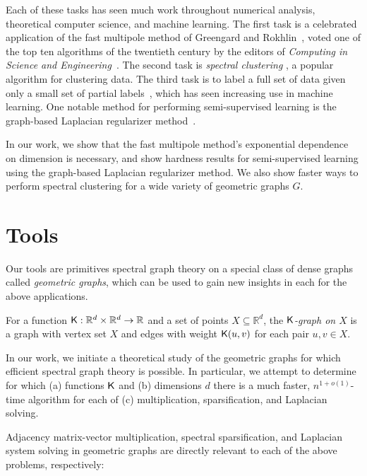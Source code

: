 \vspace{1mm}

Each of these tasks has seen much work throughout numerical analysis,
     theoretical computer science, and machine learning. The first task
     is a celebrated application of the fast multipole method of
     Greengard and Rokhlin~\cite{gr87, gr88, gr89}, voted one of the top
     ten algorithms of the twentieth century by the editors of
     \emph{Computing in Science and
       Engineering}~\cite{dongarra2000guest}.  The second task is
       \emph{spectral clustering} \cite{njw02, lwdh13}, a popular
       algorithm for clustering data. The third task is to label a full
       set of data given only a small set of partial
       labels~\cite{z05survey, csbz09, zl05}, which has seen increasing
       use in machine learning. One notable method for performing
       semi-supervised learning is the graph-based Laplacian regularizer
       method~\cite{lszlh19,zl05, bns06,z05}.

In our work, we show that the fast multipole method's exponential
dependence on dimension is necessary, and show hardness results for
semi-supervised learning using the graph-based Laplacian regularizer
method. We also show faster ways to perform spectral clustering for a
wide variety of geometric graphs $G$.
\section{Tools}
Our tools are primitives
spectral graph theory on a special class of dense graphs called
\emph{geometric graphs}, which can be used to gain new insights in each
for the above applications. 

For a function $\mathsf{K}:\mathbb{R}^d\times
\mathbb{R}^d\rightarrow \mathbb{R}$ and a set of points $X\subseteq
\mathbb{R}^d$, the \emph{$\mathsf{K}$-graph on $X$} is a graph with vertex set
$X$ and edges with weight $\mathsf{K}(u,v)$ for each pair $u,v\in X$. 

In our work, we initiate a theoretical study of the geometric graphs
for which efficient spectral graph theory is possible. In particular, we
attempt to determine for which (a) functions $\mathsf{K}$ and (b) dimensions $d$
there is a much faster, $n^{1+o(1)}$-time algorithm for each of (c)
  multiplication, sparsification, and Laplacian solving. 

Adjacency
matrix-vector multiplication, spectral sparsification, and Laplacian
system solving in geometric graphs are directly relevant to each of the
above problems, respectively:

